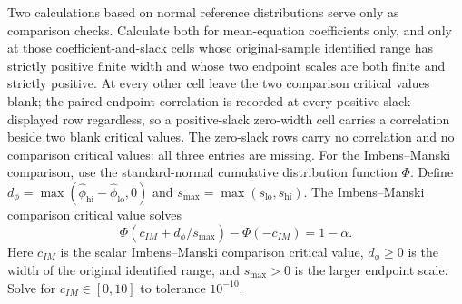 \documentclass[11pt]{article}
\begin{document}
Two calculations based on normal reference distributions serve only as comparison checks. Calculate
both for mean-equation coefficients only, and only at those coefficient-and-slack cells whose
original-sample identified range has strictly positive finite width and whose two endpoint scales are
both finite and strictly positive. At every other cell leave the two comparison critical values
blank; the paired endpoint correlation is recorded at every positive-slack displayed row regardless,
so a positive-slack zero-width cell carries a correlation beside two blank critical values. The
zero-slack rows carry no correlation and no comparison critical values: all three entries are
missing. For the
Imbens--Manski comparison, use the standard-normal cumulative distribution function \(\Phi\). Define
\(d_\phi=\max(\widehat\phi_{\mathrm{hi}}-\widehat\phi_{\mathrm{lo}},0)\) and
\(s_{\max}=\max(s_{\mathrm{lo}},s_{\mathrm{hi}})\). The
Imbens--Manski comparison critical value solves
\begin{equation*}
 \Phi(c_{IM}+d_\phi/s_{\max})-\Phi(-c_{IM})=1-\alpha.
\end{equation*}
Here \(c_{IM}\) is the scalar Imbens--Manski comparison critical value, \(d_\phi\ge0\) is the width of
the original identified range, and \(s_{\max}>0\) is the larger endpoint scale. Solve for \(c_{IM}\in[0,10]\)
to tolerance \(10^{-10}\).
\end{document}
